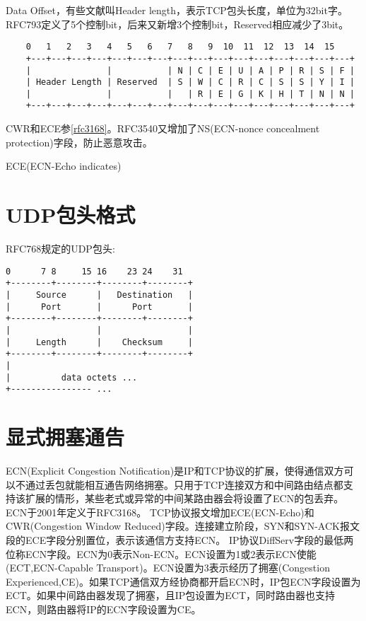 Data Offset，有些文献叫Header length，表示TCP包头长度，单位为32bit字。RFC793定义了5个控制bit，后来又新增3个控制bit，Reserved相应减少了3bit。
\begin{lstlisting}
    0   1   2   3   4   5   6   7   8   9  10  11  12  13  14  15
    +---+---+---+---+---+---+---+---+---+---+---+---+---+---+---+---+
    |               |           | N | C | E | U | A | P | R | S | F |
    | Header Length | Reserved  | S | W | C | R | C | S | S | Y | I |
    |               |           |   | R | E | G | K | H | T | N | N |
    +---+---+---+---+---+---+---+---+---+---+---+---+---+---+---+---+
\end{lstlisting}

CWR和ECE参\ref{rfc3168}。RFC3540又增加了NS(ECN-nonce concealment protection)字段，防止恶意攻击。
    

ECE(ECN-Echo indicates)

\section{UDP包头格式}
RFC768规定的UDP包头:
\begin{center}
    \begin{lstlisting}
0      7 8     15 16    23 24    31
+--------+--------+--------+--------+
|     Source      |   Destination   |
|      Port       |      Port       |
+--------+--------+--------+--------+
|                 |                 |
|     Length      |    Checksum     |
+--------+--------+--------+--------+
|
|          data octets ...
+---------------- ...

    \end{lstlisting}
\end{center}


\section{显式拥塞通告}
ECN(Explicit Congestion Notification)是IP和TCP协议的扩展，使得通信双方可以不通过丢包就能相互通告网络拥塞。只用于TCP连接双方和中间路由结点都支持该扩展的情形，某些老式或异常的中间某路由器会将设置了ECN的包丢弃。ECN于2001年定义于RFC3168。
TCP协议报文增加ECE(ECN-Echo)和CWR(Congestion Window Reduced)字段。连接建立阶段，SYN和SYN-ACK报文段的ECE字段分别置位，表示该通信方支持ECN。
IP协议DiffServ字段的最低两位称ECN字段。ECN为0表示Non-ECN。ECN设置为1或2表示ECN使能(ECT,ECN-Capable Transport)。ECN设置为3表示经历了拥塞(Congestion Experienced,CE)。如果TCP通信双方经协商都开启ECN时，IP包ECN字段设置为ECT。如果中间路由器发现了拥塞，且IP包设置为ECT，同时路由器也支持ECN，则路由器将IP的ECN字段设置为CE。

